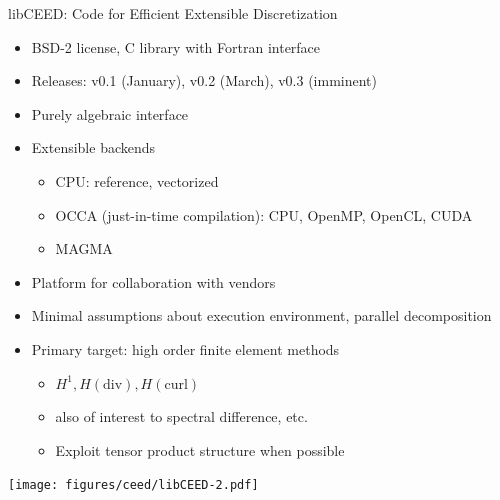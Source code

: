 \documentclass[aspectratio=169]{beamer}
\begin{document}
\begin{frame}{libCEED: Code for Efficient Extensible Discretization}
  \begin{itemize}
  \item BSD-2 license, C library with Fortran interface
  \item Releases: v0.1 (January), v0.2 (March), v0.3 (imminent)
  \item Purely algebraic interface
  \item Extensible backends
    \begin{itemize}
    \item CPU: reference, vectorized
    \item OCCA (just-in-time compilation): CPU, OpenMP, OpenCL, CUDA
    \item MAGMA
    \end{itemize}
  \item Platform for collaboration with vendors
  \item Minimal assumptions about execution environment, parallel decomposition
  \item Primary target: high order finite element methods
    \begin{itemize}
    \item $H^1, H(\mathrm{div}), H(\mathrm{curl})$
    \item also of interest to spectral difference, etc.
    \item Exploit tensor product structure when possible
    \end{itemize}
  \end{itemize}
\end{frame}

\begin{frame}
  \texttt{[image: figures/ceed/libCEED-2.pdf]}
\end{frame}
\end{document}
